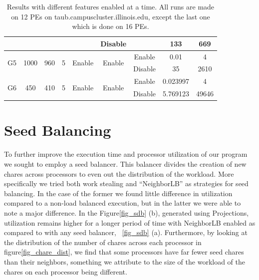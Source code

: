 \documentclass[10pt,twoside]{article}
\begin{document}
\begin{table}[t]
{\begin{tabular}{|c|c|c|c|c|c|c|c|c|}
                        &                       &                      &                     &                         & Disable                 &                         & 133                & 669      \\ \hline
    \multirow{2}{*}{G5} & \multirow{2}{*}{1000} & \multirow{2}{*}{960} & \multirow{2}{*}{5}  & \multirow{2}{*}{Enable} & \multirow{2}{*}{Enable} & Enable                  & 0.01               & 4        \\ \cline{7-9} 
                        &                       &                      &                     &                         &                         & Disable                 & 35                 & 2610     \\ \hline
    \multirow{2}{*}{G6} & \multirow{2}{*}{450}  & \multirow{2}{*}{410} & \multirow{2}{*}{5}  & \multirow{2}{*}{Enable} & \multirow{2}{*}{Enable} & Enable                  & 0.023997           & 4        \\ \cline{7-9} 
                        &                       &                      &                     &                         &                         & Disable                 & 5.769123           & 49646    \\ \hline
    \end{tabular}
  }
\caption{Results with different features enabled at a time. All runs are made on 12 PEs on taub.campuscluster.illinois.edu, except the last one which is done on 16 PEs.}
\label{tb:2}
\end{table}


\section{Seed Balancing}
To further improve the execution time and processor utilization of our program
  we sought to employ a seed balancer. This balancer divides the creation of
  new chares across processors to even out the distribution of the workload.
  More specifically we tried both work stealing and ``NeighborLB'' as strategies
  for seed balancing. In the case of the former we found little difference in
    utilization compared to a non-load balanced execution, but in the latter we
      were able to note a major difference. In the Figure\ref{fig_sdb} (b), generated
      using Projections, utilization remains higher for a longer period of time
      with NeighborLB enabled as compared to with any seed balancer,
           ~\ref{fig_sdb} (a).  Furthermore, by looking at the distribution of
             the number of chares across each processor in figure\ref{fig_chare_dist}, we
             find that some processors have far fewer seed chares than their
             neighbors, something we attribute to the size of the workload of
             the chares on each processor being different.
\end{document}
